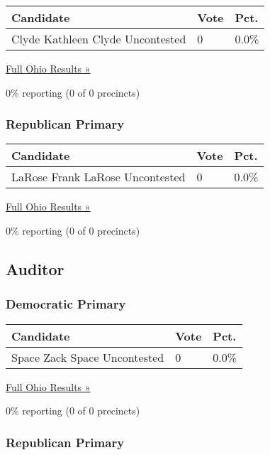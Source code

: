 \begin{longtable}[]{@{}lll@{}}
\toprule
Candidate & Vote & Pct.\tabularnewline
\midrule
\endhead
 Clyde Kathleen Clyde Uncontested & 0 & 0.0\%\tabularnewline
\bottomrule
\end{longtable}

\href{https://www.nytimes3xbfgragh.onion/elections/results/ohio}{Full
Ohio Results »}

0\% reporting (0 of 0 precincts)

\hypertarget{republican-primary-19}{%
\subsubsection{Republican Primary}\label{republican-primary-19}}

\begin{longtable}[]{@{}lll@{}}
\toprule
Candidate & Vote & Pct.\tabularnewline
\midrule
\endhead
 LaRose Frank LaRose Uncontested & 0 & 0.0\%\tabularnewline
\bottomrule
\end{longtable}

\href{https://www.nytimes3xbfgragh.onion/elections/results/ohio}{Full
Ohio Results »}

0\% reporting (0 of 0 precincts)

\hypertarget{auditor}{%
\subsection{Auditor}\label{auditor}}

\hypertarget{democratic-primary-20}{%
\subsubsection{Democratic Primary}\label{democratic-primary-20}}

\begin{longtable}[]{@{}lll@{}}
\toprule
Candidate & Vote & Pct.\tabularnewline
\midrule
\endhead
 Space Zack Space Uncontested & 0 & 0.0\%\tabularnewline
\bottomrule
\end{longtable}

\href{https://www.nytimes3xbfgragh.onion/elections/results/ohio}{Full
Ohio Results »}

0\% reporting (0 of 0 precincts)

\hypertarget{republican-primary-20}{%
\subsubsection{Republican Primary}\label{republican-primary-20}}

